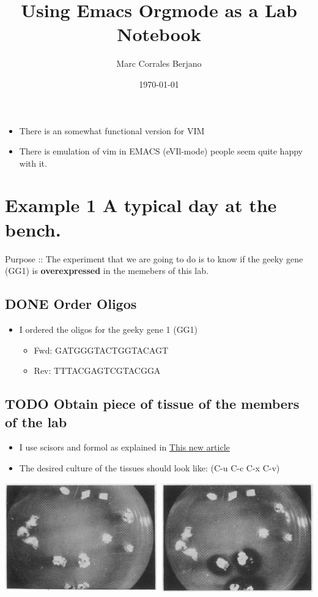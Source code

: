 \documentclass[11pt]{article}
\author{Marc Corrales Berjano}
\date{\today}
\title{Using Emacs Orgmode as a Lab Notebook}
\begin{document}
\maketitle
\tableofcontents

\begin{itemize}
\item There is an somewhat functional version for VIM
\item There is emulation of vim in EMACS (eVIl-mode) people seem quite happy with it.
\end{itemize}

\section{Example 1 A typical day at the bench.}
\label{sec:orga70ef69}
Purpose :: The experiment that we are going to do is to know if the geeky gene (GG1)
is \textbf{overexpressed} in the memebers of this lab.

\subsection{{\bfseries\sffamily DONE} Order Oligos}
\label{sec:org446e428}
\begin{itemize}
\item I ordered the oligos for the geeky gene 1 (GG1)
\begin{itemize}
\item Fwd: GATGGGTACTGGTACAGT
\item Rev: TTTACGAGTCGTACGGA
\end{itemize}
\end{itemize}

\subsection{{\bfseries\sffamily TODO} Obtain piece of tissue of the members of the lab}
\label{sec:org463a915}
\begin{itemize}
\item I use scisors and formol as explained in \href{PNAS-1962-Gross-1014-22.pdf}{This new article}
\item The desired culture of the tissues should look like: (C-u C-c C-x C-v)
\end{itemize}

\begin{center}
\includegraphics[width=.9\linewidth]{disgusting.png}
\end{center}
\end{document}

